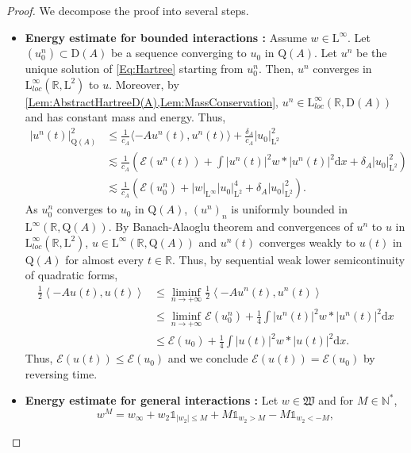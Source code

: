 \documentclass{article}
\def\R{\mathbb R}
\def\N{\mathbb N}
\def\L{\mathrm L}
\def\Q{\mathrm Q}
\def\d{\mathrm{d}}
\newcommand{\indic}[1]{\mathds{1}_{#1}}
\theoremstyle{definition}
\numberwithin{equation}{section}
\begin{document}
\begin{proof}

    We decompose the proof into several steps.
    \begin{itemize}
        \item \textbf{Energy estimate for bounded interactions :} Assume $w\in\L^\infty$. Let $(u_0^n)\subset\mathrm{D}(A)$ be a sequence converging to $u_0$ in $\Q(A)$. Let $u^n$ be the unique solution of \cref{Eq:Hartree} starting from $u_0^n$. Then, $u^n$ converges in $\L^\infty_{loc}(\R,\L^2)$ to $u$. Moreover, by \cref{Lem:AbstractHartreeD(A),Lem:MassConservation}, $u^n\in\L^\infty_{loc}(\R,\mathrm{D}(A))$ and has constant mass and energy. Thus,
        \begin{align*}
            \left|u^n(t)\right|_{\Q(A)}^2&\leqslant \frac{1}{c_A} \langle -Au^n(t),u^n(t)\rangle+\frac{\delta_A}{c_A}|u_0|_{\L^2}^2\\
            &\lesssim \frac{1}{c_A}\left(\mathcal{E}(u^n(t)) + \int \left|u^n(t)\right|^2w*\left|u^n(t)\right|^2\d x+\delta_A|u_0|_{\L^2}^2\right)\\
            &\lesssim \frac{1}{c_A}\left(\mathcal{E}(u^n_0) + |w|_{\L^\infty}|u_0|_{\L^2}^4+\delta_A|u_0|_{\L^2}^2\right).
        \end{align*}
        As $u_0^n$ converges to $u_0$ in $\Q(A)$, $(u^n)_n$ is uniformly bounded in $\L^\infty(\R,\Q(A))$. By Banach-Alaoglu theorem and convergences of $u^n$ to $u$ in  $\L^\infty_{loc}(\R,\L^2)$, $u\in\L^\infty(\R,\Q(A))$ and $u^n(t)$ converges weakly to $u(t)$ in $\Q(A)$ for almost every $t\in\R$. Thus, by sequential weak lower semicontinuity of quadratic forms,
        \begin{align*}
            \frac{1}{2}\left\langle -Au(t),u(t)\right\rangle &\leqslant \liminf_{n\to+\infty} \frac{1}{2}\left\langle -Au^n(t),u^n(t)\right\rangle\\
            &\leqslant \liminf_{n\to+\infty} \mathcal{E}(u_0^n)+\frac{1}{4}\int \left|u^n(t)\right|^2w*\left|u^n(t)\right|^2\d x\\
            &\leqslant \mathcal{E}(u_0)+\frac{1}{4}\int \left|u(t)\right|^2w*\left|u(t)\right|^2\d x.
        \end{align*}
        Thus, $\mathcal{E}(u(t))\leqslant\mathcal{E}(u_0)$ and we conclude $\mathcal{E}(u(t))=\mathcal{E}(u_0)$  by reversing time.
        \item \textbf{Energy estimate for general interactions :} Let $w\in\mathfrak{W}$ and for $M\in\N^*$, 
        $$w^M=w_\infty+w_2\indic{|w_2|\leqslant M}+M\indic{w_2>M}-M\indic{w_2<-M},$$

\end{itemize}
\end{proof}
\end{document}

